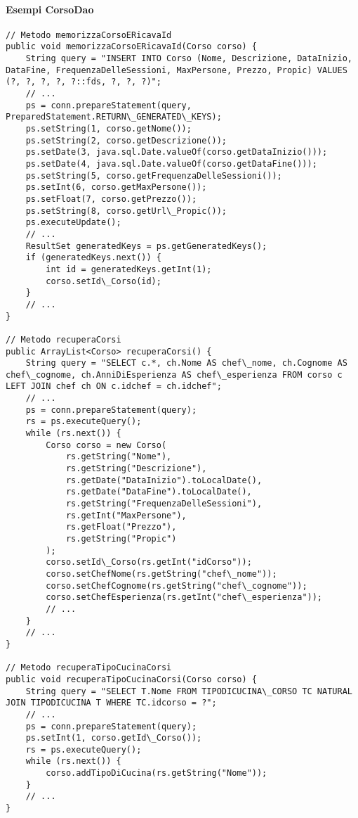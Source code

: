 \paragraph{Esempi CorsoDao}
\begin{verbatim}
// Metodo memorizzaCorsoERicavaId
public void memorizzaCorsoERicavaId(Corso corso) {
    String query = "INSERT INTO Corso (Nome, Descrizione, DataInizio, DataFine, FrequenzaDelleSessioni, MaxPersone, Prezzo, Propic) VALUES (?, ?, ?, ?, ?::fds, ?, ?, ?)";
    // ...
    ps = conn.prepareStatement(query, PreparedStatement.RETURN\_GENERATED\_KEYS);
    ps.setString(1, corso.getNome());
    ps.setString(2, corso.getDescrizione());
    ps.setDate(3, java.sql.Date.valueOf(corso.getDataInizio()));
    ps.setDate(4, java.sql.Date.valueOf(corso.getDataFine()));
    ps.setString(5, corso.getFrequenzaDelleSessioni());
    ps.setInt(6, corso.getMaxPersone());
    ps.setFloat(7, corso.getPrezzo());
    ps.setString(8, corso.getUrl\_Propic());
    ps.executeUpdate();
    // ...
    ResultSet generatedKeys = ps.getGeneratedKeys();
    if (generatedKeys.next()) {
        int id = generatedKeys.getInt(1);
        corso.setId\_Corso(id);
    }
    // ...
}

// Metodo recuperaCorsi
public ArrayList<Corso> recuperaCorsi() {
    String query = "SELECT c.*, ch.Nome AS chef\_nome, ch.Cognome AS chef\_cognome, ch.AnniDiEsperienza AS chef\_esperienza FROM corso c LEFT JOIN chef ch ON c.idchef = ch.idchef";
    // ...
    ps = conn.prepareStatement(query);
    rs = ps.executeQuery();
    while (rs.next()) {
        Corso corso = new Corso(
            rs.getString("Nome"),
            rs.getString("Descrizione"),
            rs.getDate("DataInizio").toLocalDate(),
            rs.getDate("DataFine").toLocalDate(),
            rs.getString("FrequenzaDelleSessioni"),
            rs.getInt("MaxPersone"),
            rs.getFloat("Prezzo"),
            rs.getString("Propic")
        );
        corso.setId\_Corso(rs.getInt("idCorso"));
        corso.setChefNome(rs.getString("chef\_nome"));
        corso.setChefCognome(rs.getString("chef\_cognome"));
        corso.setChefEsperienza(rs.getInt("chef\_esperienza"));
        // ...
    }
    // ...
}

// Metodo recuperaTipoCucinaCorsi
public void recuperaTipoCucinaCorsi(Corso corso) {
    String query = "SELECT T.Nome FROM TIPODICUCINA\_CORSO TC NATURAL JOIN TIPODICUCINA T WHERE TC.idcorso = ?";
    // ...
    ps = conn.prepareStatement(query);
    ps.setInt(1, corso.getId\_Corso());
    rs = ps.executeQuery();
    while (rs.next()) {
        corso.addTipoDiCucina(rs.getString("Nome"));
    }
    // ...
}


\end{verbatim}
